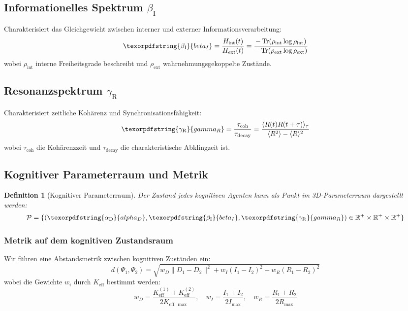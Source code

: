 \documentclass[12pt,a4paper]{article}
\newtheorem{definition}{Definition}
\DeclareMathOperator{\Tr}{Tr}
\DeclareRobustCommand{\alD}{\texorpdfstring{\ensuremath{\alpha_{\mathrm{D}}}}{alpha_D}}
\DeclareRobustCommand{\beI}{\texorpdfstring{\ensuremath{\beta_{\mathrm{I}}}}{beta_I}}
\DeclareRobustCommand{\gaR}{\texorpdfstring{\ensuremath{\gamma_{\mathrm{R}}}}{gamma_R}}
\newcommand{\eff}{\mathrm{eff}}
\newcommand{\Ke}{K_{\eff}}
\newcommand{\Kemax}{K_{\eff,\max}}
\begin{document}
	\subsection{Informationelles Spektrum \beI}
	
	Charakterisiert das Gleichgewicht zwischen interner und externer Informationsverarbeitung:
	\begin{equation}
		\label{eq:betaI}
		\beI = \frac{H_{\mathrm{int}}(t)}{H_{\mathrm{ext}}(t)} = \frac{-\Tr(\rho_{\mathrm{int}}\log\rho_{\mathrm{int}})}{-\Tr(\rho_{\mathrm{ext}}\log\rho_{\mathrm{ext}})}
	\end{equation}
	wobei \(\rho_{\mathrm{int}}\) interne Freiheitsgrade beschreibt und \(\rho_{\mathrm{ext}}\) wahrnehmungsgekoppelte Zustände.
	
	\subsection{Resonanzspektrum \gaR}
	
	Charakterisiert zeitliche Kohärenz und Synchronisationsfähigkeit:
	\begin{equation}
		\label{eq:gammaR}
		\gaR = \frac{\tau_{\mathrm{coh}}}{\tau_{\mathrm{decay}}} = \frac{\langle R(t)R(t+\tau)\rangle_\tau}{\langle R^2\rangle - \langle R\rangle^2}
	\end{equation}
	wobei \(\tau_{\mathrm{coh}}\) die Kohärenzzeit und \(\tau_{\mathrm{decay}}\) die charakteristische Abklingzeit ist.
	
	\subsection{Kognitiver Parameterraum und Metrik}
	
	\begin{definition}[Kognitiver Parameterraum]
		Der Zustand jedes kognitiven Agenten kann als Punkt im 3D-Parameterraum dargestellt werden:
		\[
		\mathcal{P} = \{(\alD, \beI, \gaR) \in \mathbb{R}^+ \times \mathbb{R}^+ \times \mathbb{R}^+\}
		\]
	\end{definition}
	
	\subsubsection{Metrik auf dem kognitiven Zustandsraum}
	Wir führen eine Abstandsmetrik zwischen kognitiven Zuständen ein:
	\[
	d(\Psi_1, \Psi_2) = \sqrt{w_D \|D_1 - D_2\|^2 + w_I (I_1 - I_2)^2 + w_R (R_1 - R_2)^2}
	\]
	wobei die Gewichte \(w_i\) durch \(\Ke\) bestimmt werden:
	\[
	w_D = \frac{\Ke^{(1)} + \Ke^{(2)}}{2\Kemax}, \quad w_I = \frac{I_1 + I_2}{2I_{\max}}, \quad w_R = \frac{R_1 + R_2}{2R_{\max}}
	\]
	
\end{document}
